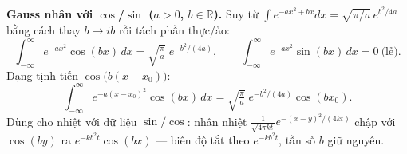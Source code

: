 \textbf{Gauss nhân với $\cos$/$\sin$ ($a>0$, $b\in\mathbb{R}$).} Suy từ $\int e^{-ax^2+bx}dx=\sqrt{\pi/a}\,e^{b^2/4a}$ bằng cách thay $b\to ib$ rồi tách phần thực/ảo:
$$\int_{-\infty}^{\infty} e^{-ax^2}\cos(bx)\,dx=\sqrt{\tfrac{\pi}{a}}\;e^{-b^2/(4a)},\qquad
  \int_{-\infty}^{\infty} e^{-ax^2}\sin(bx)\,dx=0\ \text{(lẻ)}.$$
Dạng tịnh tiến $\cos\!\big(b(x-x_0)\big)$:
$$\int_{-\infty}^{\infty} e^{-a(x-x_0)^2}\cos(bx)\,dx=\sqrt{\tfrac{\pi}{a}}\;e^{-b^2/(4a)}\cos(bx_0).$$
Dùng cho nhiệt với dữ liệu $\sin/\cos$: nhân nhiệt $\tfrac{1}{\sqrt{4\pi kt}}e^{-(x-y)^2/(4kt)}$ chập với $\cos(by)$ ra $e^{-kb^2 t}\cos(bx)$ --- biên độ tắt theo $e^{-kb^2 t}$, tần số $b$ giữ nguyên.
